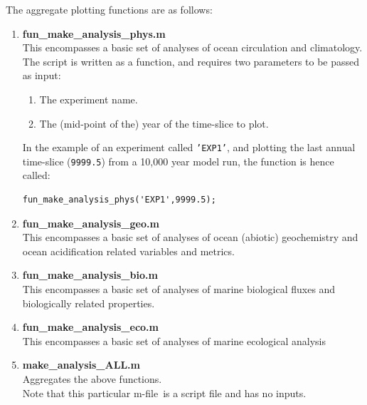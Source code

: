 \documentclass[11pt,fleqn]{book} %
\begin{document}
The aggregate plotting functions are as follows:

\begin{enumerate}[noitemsep]

\vspace{2pt}
\item \footnotesize\textbf{\textsf{fun\_make\_analysis\_phys.m}}\normalsize \\This encompasses a basic set of analyses of ocean circulation and climatology.
\\The script is written as a function, and requires two parameters to be passed as input:
\begin{enumerate}[noitemsep]
\setlength{\itemindent}{.2in}
\item The experiment name.
\item The (mid-point of the) year of the time-slice to plot.
\end{enumerate}
In the example of an experiment called \texttt{'EXP1'}, and plotting the last annual time-slice (\texttt{9999.5}) from a 10,000 year model run, the function is hence called:
\vspace{-0pt}\begin{verbatim}
fun_make_analysis_phys('EXP1',9999.5);
\end{verbatim}\vspace{-0pt}

\vspace{2pt}
\item \footnotesize\textbf{\textsf{fun\_make\_analysis\_geo.m}}\normalsize \\This encompasses a basic set of analyses of ocean (abiotic) geochemistry and ocean acidification related variables and metrics.
\\

\vspace{2pt}
\item \footnotesize\textbf{\textsf{fun\_make\_analysis\_bio.m}}\normalsize \\This encompasses a basic set of analyses of marine biological fluxes and biologically related properties.
\\

\vspace{2pt}
\item \footnotesize\textbf{\textsf{fun\_make\_analysis\_eco.m}}\normalsize \\This encompasses a basic set of analyses of marine ecological analysis 
\\

\vspace{2pt}
\item \footnotesize\textbf{\textsf{make\_analysis\_ALL.m}}\normalsize
\\Aggregates the above functions.
\\Note that this particular \footnotesize\textsf{m-file}\normalsize \ is a script file and has no inputs. 
\end{enumerate}
\end{document}
